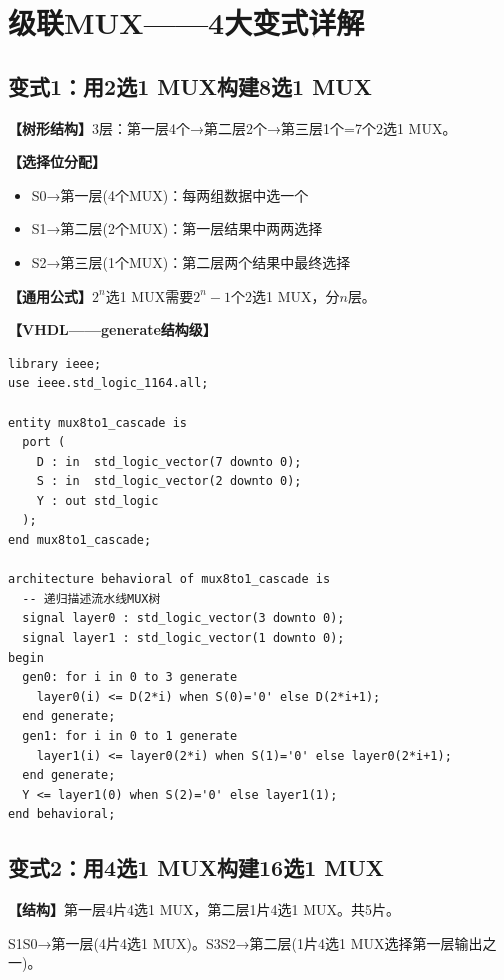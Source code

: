 \chapter{级联MUX——4大变式详解}

\section{变式1：用2选1 MUX构建8选1 MUX}

\begin{detailbox}[完整教学]
\textbf{【树形结构】}3层：第一层4个→第二层2个→第三层1个=7个2选1 MUX。

\textbf{【选择位分配】}
\begin{itemize}
  \item S0→第一层(4个MUX)：每两组数据中选一个
  \item S1→第二层(2个MUX)：第一层结果中两两选择
  \item S2→第三层(1个MUX)：第二层两个结果中最终选择
\end{itemize}

\textbf{【通用公式】}$2^n$选1 MUX需要$2^n-1$个2选1 MUX，分$n$层。

\textbf{【VHDL——generate结构级】}
\begin{lstlisting}[caption={8选1 MUX（2选1树形级联）}]
library ieee;
use ieee.std_logic_1164.all;

entity mux8to1_cascade is
  port (
    D : in  std_logic_vector(7 downto 0);
    S : in  std_logic_vector(2 downto 0);
    Y : out std_logic
  );
end mux8to1_cascade;

architecture behavioral of mux8to1_cascade is
  -- 递归描述流水线MUX树
  signal layer0 : std_logic_vector(3 downto 0);
  signal layer1 : std_logic_vector(1 downto 0);
begin
  gen0: for i in 0 to 3 generate
    layer0(i) <= D(2*i) when S(0)='0' else D(2*i+1);
  end generate;
  gen1: for i in 0 to 1 generate
    layer1(i) <= layer0(2*i) when S(1)='0' else layer0(2*i+1);
  end generate;
  Y <= layer1(0) when S(2)='0' else layer1(1);
end behavioral;
\end{lstlisting}
\end{detailbox}


\section{变式2：用4选1 MUX构建16选1 MUX}

\begin{detailbox}[完整教学]
\textbf{【结构】}第一层4片4选1 MUX，第二层1片4选1 MUX。共5片。

S1S0→第一层(4片4选1 MUX)。S3S2→第二层(1片4选1 MUX选择第一层输出之一)。
\end{detailbox}


